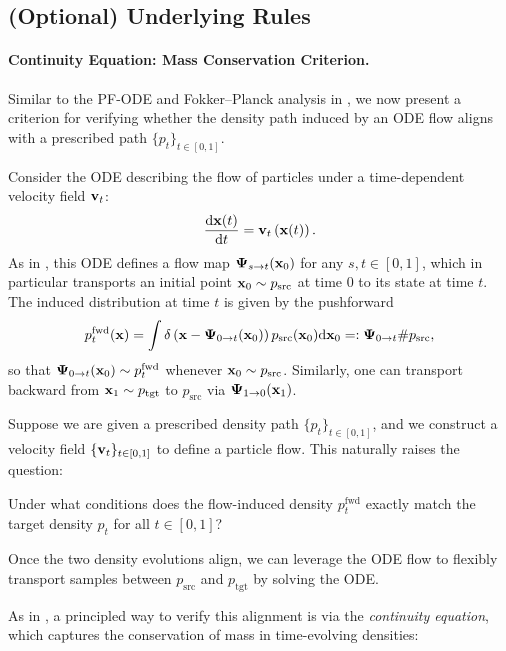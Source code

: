 \subsection{(Optional) Underlying Rules}\label{subsec:fm-theory}

\paragraph{Continuity Equation: Mass Conservation Criterion.}  
Similar to the PF-ODE and Fokker–Planck analysis in , we now present a criterion for verifying whether the density path induced by an ODE flow aligns with a prescribed path $\{p_t\}_{t \in [0,1]}$.

Consider the ODE describing the flow of particles under a time-dependent velocity field ${\mathbf{v}}_t$:
\[
\frac{\mathop{}\!\mathrm{d} {\mathbf{x}}(t)}{\mathop{}\!\mathrm{d} t} = {\mathbf{v}}_t\left({\mathbf{x}}(t)\right).
\]
As in , this ODE defines a flow map 
$\bm{\Psi}_{s\to t}({\mathbf{x}}_0)$ for any $s,t \in [0,1]$, which in particular 
transports an initial point ${\mathbf{x}}_0 \sim p_{\mathrm{src}}$ at time $0$ to its 
state at time $t$.  
The induced distribution at time $t$ is given by the pushforward
\begin{align}\label{eq:ode-pushforward}
    p_t^{\mathrm{fwd}}({\mathbf{x}}) 
    = \int \delta \left({\mathbf{x}} - \bm{\Psi}_{0\to t}({\mathbf{x}}_0)\right) 
      p_{\mathrm{src}}({\mathbf{x}}_0) \mathrm{d}{\mathbf{x}}_0=: \bm{\Psi}_{0\to t}\# p_{\mathrm{src}},
\end{align}
so that $\bm{\Psi}_{0\to t}({\mathbf{x}}_0) \sim p_t^{\mathrm{fwd}}$ whenever 
${\mathbf{x}}_0 \sim p_{\mathrm{src}}$.  
Similarly, one can transport backward from ${\mathbf{x}}_1 \sim p_{\mathrm{tgt}}$ 
to $p_{\mathrm{src}}$ via $\bm{\Psi}_{1\to 0}({\mathbf{x}}_1)$.




Suppose we are given a prescribed density path $\{p_t\}_{t \in [0,1]}$, and we construct a velocity field $\{{\mathbf{v}}_t\}_{t \in [0,1]}$ to define a particle flow. This naturally raises the question:

\begin{question}
    Under what conditions does the flow-induced density $p_t^{\mathrm{fwd}}$  exactly match the target density $p_t$ for all $t \in [0,1]$?
\end{question}
Once the two density evolutions align, we can leverage the ODE flow to flexibly transport samples between $p_{\mathrm{src}}$ and $p_{\mathrm{tgt}}$ by solving the ODE.

As in , a principled way to verify this alignment is via the \emph{continuity equation}, which captures the conservation of mass in time-evolving densities:


